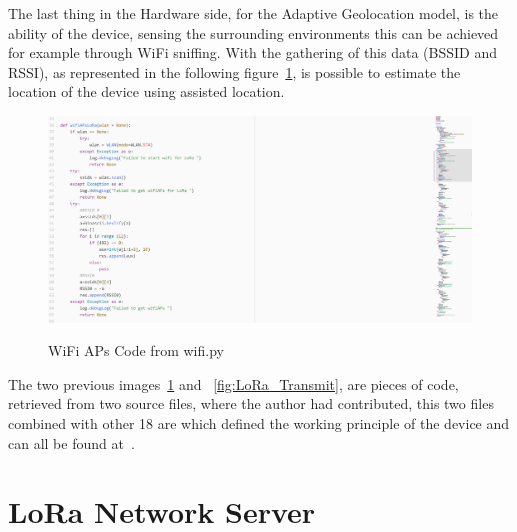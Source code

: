 The last thing in the Hardware side, for the Adaptive Geolocation model, is the ability of the device, sensing the surrounding environments this can be achieved for example through WiFi sniffing. With the gathering of this data (BSSID and RSSI), as represented in the following figure~\ref{fig:WifiAps}, is possible to estimate the location of the device using assisted location. 

\begin{figure}[htbp]
  \centering
  
    {\includegraphics[width=0.9\linewidth]{Chapters/Figures/wifiapswhite.JPG}}%
 
  \caption{WiFi APs Code from wifi.py~\cite{githubcode}}
  \label{fig:WifiAps}
\end{figure}

The two previous images~\ref{fig:WifiAps} and ~\ref{fig:LoRa_Transmit}, are pieces of code, retrieved from two source files, where the author had contributed, this two files combined with other 18 are which defined the working principle of the device and can all be found at~\cite{githubcode}. 








\newpage

\section{LoRa Network Server} %
\label{sec:server}
